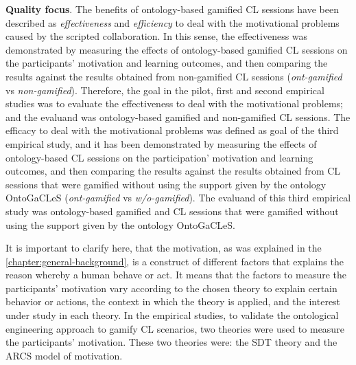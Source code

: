 \textbf{Quality focus}. The benefits of ontology-based gamified CL sessions have been described as \emph{effectiveness} and \emph{efficiency} to deal with the motivational problems caused by the scripted collaboration. In this sense, the effectiveness was demonstrated by measuring the effects of ontology-based gamified CL sessions on the participants' motivation and learning outcomes, and then comparing the results against the results obtained from non-gamified CL sessions (\emph{ont-gamified} vs \emph{non-gamified}). Therefore, the goal in the pilot, first and second empirical studies was to evaluate the effectiveness to deal with the motivational problems; and the evaluand was ontology-based gamified and non-gamified CL sessions. The efficacy to deal with the motivational problems was defined as goal of the third empirical study, and it has been demonstrated by measuring the effects of ontology-based CL sessions on the participation' motivation and learning outcomes, and then comparing the results against the results obtained from CL sessions that were gamified without using the support given by the ontology OntoGaCLeS (\emph{ont-gamified} vs \emph{w/o-gamified}). The evaluand of this third empirical study was ontology-based gamified and CL sessions that were gamified without using the support given by the ontology OntoGaCLeS.

It is important to clarify here, that the motivation, as was explained in the \autoref{chapter:general-background}, is a construct of different factors that explains the reason whereby a human behave or act. It means that the factors to measure the participants' motivation vary according to the chosen theory to explain certain behavior or actions, the context in which the theory is applied, and the interest under study in each theory. In the empirical studies, to validate the ontological engineering approach to gamify CL scenarios, two theories were used to measure the participants' motivation. These two theories were: the SDT theory and the ARCS model of motivation.

